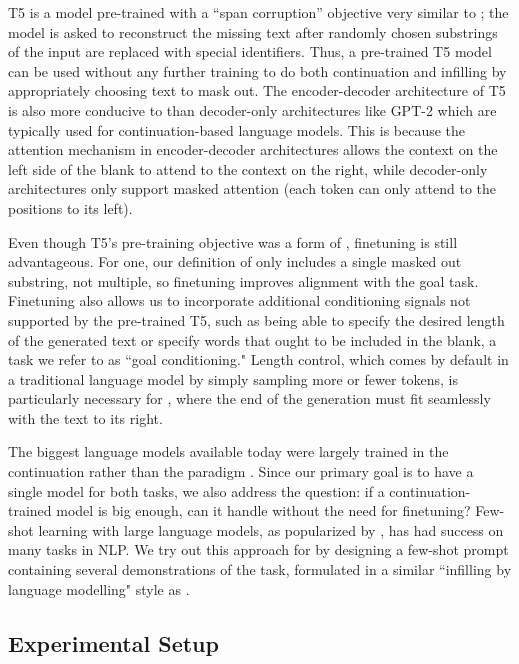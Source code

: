 T5 is a model pre-trained with a ``span corruption'' objective very similar to \FitB; the model is asked to reconstruct the missing text after randomly chosen substrings of the input are replaced with special identifiers.
Thus, a pre-trained T5 model can be used without any further training to do both continuation and infilling by appropriately choosing text to mask out.
The encoder-decoder architecture of T5 is also more conducive to \FitB{} than decoder-only architectures like GPT-2 \citep{radford2019language} which are typically used for continuation-based language models.
This is because the attention mechanism in encoder-decoder architectures allows the context on the left side of the blank to attend to the context on the right, while decoder-only architectures only support masked attention (each token can only attend to the positions to its left).

Even though T5's pre-training objective was a form of \FitB, finetuning is still advantageous.
For one, our definition of \FitB{} only includes a single masked out substring, not multiple, so finetuning improves alignment with the goal task.
Finetuning also allows us to incorporate additional conditioning signals not supported by the pre-trained T5, such as being able to specify the desired length of the generated text or specify words that ought to be included in the blank, a task we refer to as ``goal conditioning."
Length control, which comes by default in a traditional language model
by simply sampling more or fewer
tokens, is particularly necessary for \FitB, where the end of the generation must fit seamlessly with the text to its right.

The biggest language models available today were largely trained in the continuation rather than the \FitB{} paradigm \citep{gpt3,gpt-neo}.
Since our primary goal is to have a single model for both tasks, we also address the question: if a continuation-trained model is big enough, can it handle \FitB{} without the need for finetuning?
Few-shot learning with large language models, as popularized by \citet{gpt3}, has had success on many tasks in NLP.
We try out this approach for \FitB{} by designing a few-shot prompt containing several demonstrations of the \FitB{} task, formulated in a similar ``infilling by language modelling" style as \citet{donahue2020enabling}.

\subsection{Experimental Setup}
